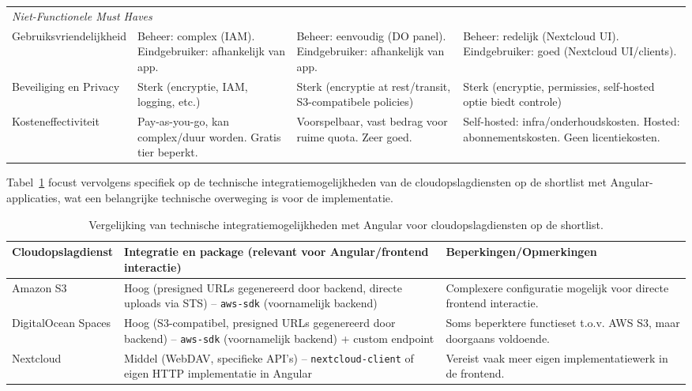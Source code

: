 \begin{table}[H]
\begin{tabular}{l p{3.5cm} p{3.5cm} p{3.5cm}}
      \midrule
      \multicolumn{4}{l}{\textit{Niet-Functionele Must Haves}} \\ %
      Gebruiksvriendelijkheid & Beheer: complex (IAM). Eindgebruiker: afhankelijk van app. & Beheer: eenvoudig (DO panel). Eindgebruiker: afhankelijk van app. & Beheer: redelijk (Nextcloud UI). Eindgebruiker: goed (Nextcloud UI/clients). \\
      \midrule
      Beveiliging en Privacy & Sterk (encryptie, IAM, logging, etc.) & Sterk (encryptie at rest/transit, S3-compatibele policies) & Sterk (encryptie, permissies, self-hosted optie biedt controle) \\
      \midrule
      Kosteneffectiviteit & Pay-as-you-go, kan complex/duur worden. Gratis tier beperkt. & Voorspelbaar, vast bedrag voor ruime quota. Zeer goed. & Self-hosted: infra/onderhoudskosten. Hosted: abonnementskosten. Geen licentiekosten. \\
      \bottomrule
    \end{tabular}
\end{table}

Tabel~\ref{tab:cloud-integratie-vergelijking-angular} focust vervolgens specifiek op de technische integratiemogelijkheden van de cloudopslagdiensten op de shortlist met Angular-applicaties, wat een belangrijke technische overweging is voor de implementatie.

\begin{table}[H]
    \centering
    \footnotesize
    \begin{tabular}{l p{5cm} p{5cm}}
      \toprule
      \textbf{Cloudopslagdienst} & \textbf{Integratie en package (relevant voor Angular/frontend interactie)} & \textbf{Beperkingen/Opmerkingen} \\
      \midrule
      Amazon S3 & Hoog (presigned URLs gegenereerd door backend, directe uploads via STS) – \texttt{aws-sdk} (voornamelijk backend) & Complexere configuratie mogelijk voor directe frontend interactie. \\
      DigitalOcean Spaces & Hoog (S3-compatibel, presigned URLs gegenereerd door backend) – \texttt{aws-sdk} (voornamelijk backend) + custom endpoint & Soms beperktere functieset t.o.v. AWS S3, maar doorgaans voldoende. \\
      Nextcloud & Middel (WebDAV, specifieke API's) – \texttt{nextcloud-client} of eigen HTTP implementatie in Angular & Vereist vaak meer eigen implementatiewerk in de frontend. \\
      \bottomrule
    \end{tabular}
    \caption[Vergelijking technische integratiemogelijkheden met Angular]{\label{tab:cloud-integratie-vergelijking-angular}Vergelijking van technische integratiemogelijkheden met Angular voor cloudopslagdiensten op de shortlist.}
\end{table}

